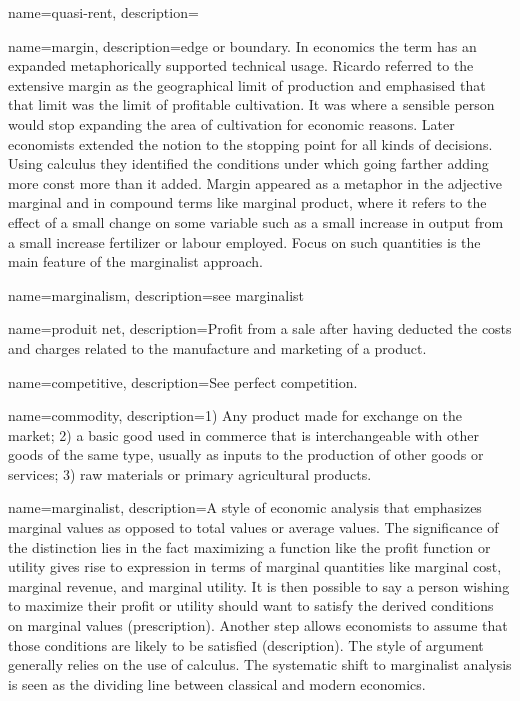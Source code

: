 {
name=quasi-rent,
description={}
}


{
name=margin,
description={edge or boundary. In economics the term has an expanded metaphorically supported technical usage. Ricardo referred to the \gls{extensive margin} as the geographical limit of production and emphasised that that limit was the limit of profitable cultivation. It was where a sensible person would stop expanding the area of cultivation for economic reasons. Later economists extended the notion to the stopping point for all kinds of decisions. Using calculus they identified the conditions under which going farther adding more const more than it added.  Margin   appeared as a metaphor in the adjective  \gls{marginal} and in compound terms like \gls{marginal product}, where it refers to the effect of a small change on some variable  such as a small increase in output  from a small increase fertilizer or labour employed. Focus on such quantities is the main feature of the \gls{marginalist} approach. }
}

{
name=marginalism,
description={see \gls{marginalist}}
}

{
name=produit net,
description={Profit from a sale after having deducted the costs and charges related to the manufacture and marketing of a product.}
}

{
name=competitive,
description={See \gls{perfect competition}.}
}

{
name=commodity,
description={1) Any product  made for exchange on the market; 2) a basic good used in commerce that is interchangeable with other goods of the same type, usually  as inputs to the production of other goods or services; 3) raw materials or primary agricultural products.}
}

{
name=marginalist,
description={A style of economic analysis that emphasizes marginal values as opposed to total values or average values. The significance of the distinction lies in the fact maximizing a function like the profit function or utility gives rise to expression in terms of marginal quantities like marginal cost, marginal revenue, and marginal utility. It is then possible to say a person wishing to maximize their profit or utility should want to satisfy the derived conditions on marginal values (prescription). Another step allows economists to assume that those conditions are likely to be satisfied (description). The style of argument generally relies on the use of calculus. The systematic shift to marginalist analysis is seen as the dividing line between classical and modern economics.}
}

